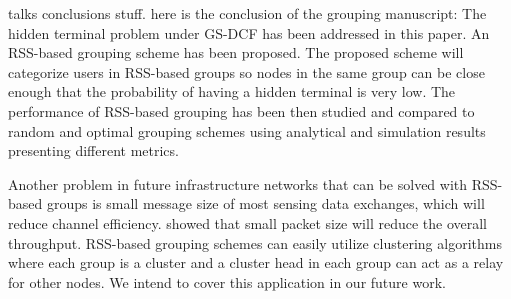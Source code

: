 \label{concl}

talks conclusions stuff. here is the conclusion of the grouping manuscript:
The hidden terminal problem under GS-DCF has been addressed in this paper. An RSS-based grouping scheme has been proposed. The proposed scheme will categorize users in RSS-based groups so nodes in the same group can be close enough that the probability of having a hidden terminal is very low.
The performance of RSS-based grouping has been then studied and compared to random and optimal grouping schemes using analytical and simulation results presenting different metrics.

Another problem in future infrastructure networks that can be solved with RSS-based groups is small message size of most sensing data exchanges, which will reduce channel efficiency. \cite{bianchi2000performance} showed that small packet size will reduce the overall throughput. RSS-based grouping schemes can easily utilize clustering algorithms where each group is a cluster and a cluster head in each group can act as a relay for other nodes. We intend to cover this application in our future work.